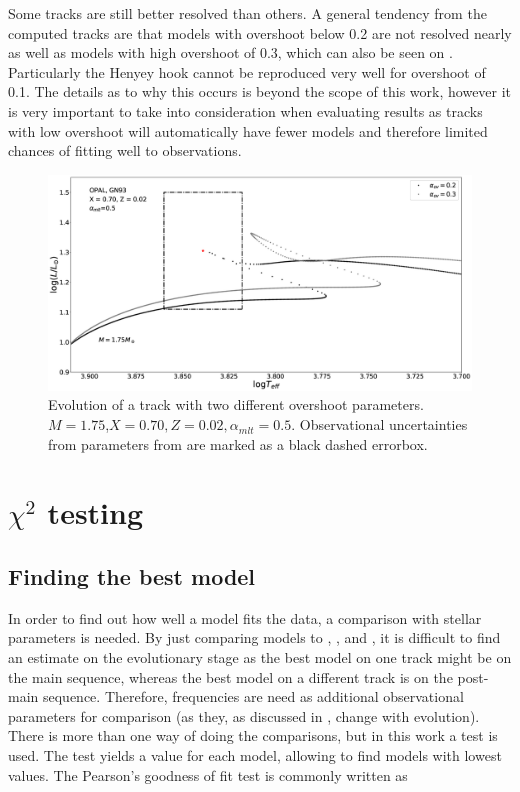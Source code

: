Some tracks are still better resolved than others. A general tendency from the computed tracks are that models with overshoot below 0.2 are not resolved nearly as well as models with high overshoot of 0.3, which can also be seen on . Particularly the Henyey hook cannot be reproduced very well for overshoot of 0.1. The details as to why this occurs is beyond the scope of this work, however it is very important to take into consideration when evaluating results as tracks with low overshoot will automatically have fewer models and therefore limited chances of fitting well to observations. 

\begin{figure}[htbp]
    \centering
    \includegraphics[width=1\textwidth]{resolution_overshoot.eps}
    \caption{Evolution of a track with two different overshoot parameters. $M= 1.75$\msun,$X=0.70, Z=0.02, \alpha_{mlt} = 0.5$.  Observational uncertainties from parameters from \citet{lenz2010delta} are marked as a black dashed errorbox.}
    \label{ovresol}
  \end{figure}


\section{$\chi^2$ testing}
\label{sec:chis}

\subsection{Finding the best model}
\label{bestmodel}


In order to find out how well a model fits the data, a comparison with stellar parameters is needed. By just comparing models to \lum,  \teff, and \logg, it is difficult to find an estimate on the evolutionary stage as the best model on one track might be on the main sequence, whereas the best model on a different track is on the post-main sequence. Therefore, frequencies are need as additional observational parameters for comparison (as they, as discussed in , change with evolution). There is more than one way of doing the comparisons, but in this work a \chis test is used. The \chis test yields a value for each model, allowing to find models with lowest \chis values. The Pearson's goodness of fit test is commonly written as 

